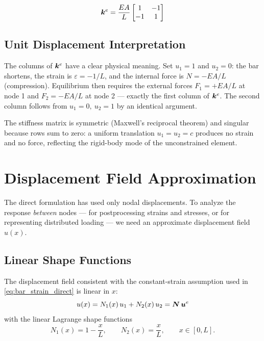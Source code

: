 \begin{importantbox}
\begin{equation*}
    \bm{k}^e = \frac{EA}{L}\begin{bmatrix} 1 & -1 \\ -1 & 1 \end{bmatrix}
\end{equation*}
\end{importantbox}

\subsection{Unit Displacement Interpretation}

The columns of $\bm{k}^e$ have a clear physical meaning. Set $u_1=1$ and
$u_2=0$: the bar shortens, the strain is $\varepsilon = -1/L$, and the internal
force is $N = -EA/L$ (compression). Equilibrium then requires the external
forces $F_1 = +EA/L$ at node 1 and $F_2 = -EA/L$ at node 2 — exactly the first
column of $\bm{k}^e$. The second column follows from $u_1=0,\ u_2=1$ by an
identical argument.

\begin{remark}
The stiffness matrix is symmetric (Maxwell's reciprocal theorem) and singular
because rows sum to zero: a uniform translation $u_1=u_2=c$ produces no
strain and no force, reflecting the rigid-body mode of the unconstrained
element.
\end{remark}

\section{Displacement Field Approximation}
\label{sec:displacement_field}

The direct formulation has used only nodal displacements. To analyze the
response \emph{between} nodes — for postprocessing strains and stresses, or for
representing distributed loading — we need an approximate displacement field
$u(x)$.

\subsection{Linear Shape Functions}

The displacement field consistent with the constant-strain assumption used in
\cref{eq:bar_strain_direct} is linear in $x$:
\begin{equation}
    u(x) = N_1(x)\,u_1 + N_2(x)\,u_2 = \bm{N}\,\bm{u}^e
    \label{eq:bar_disp}
\end{equation}
with the linear Lagrange shape functions
\begin{equation}
    N_1(x) = 1 - \frac{x}{L}, \qquad N_2(x) = \frac{x}{L},
    \qquad x \in [0,L] .
    \label{eq:bar_shape}
\end{equation}

